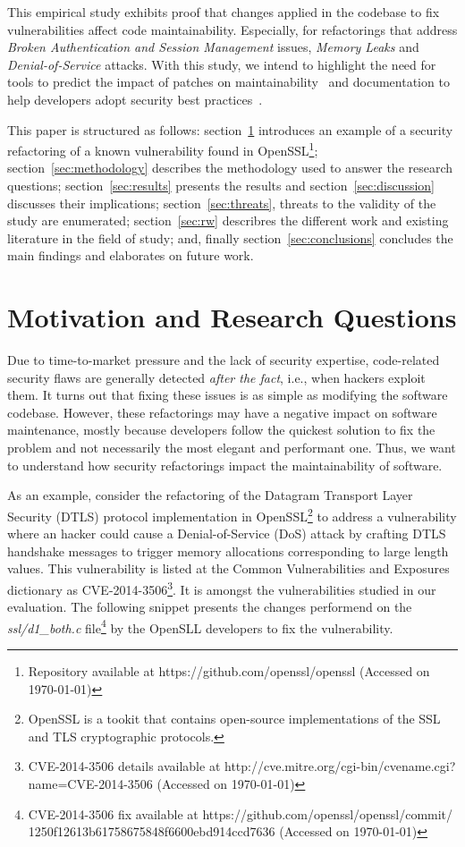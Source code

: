 \documentclass[10pt,conference]{IEEEtran}
\begin{document}
This empirical study exhibits proof that changes applied in the codebase to fix
vulnerabilities affect code maintainability. Especially, for refactorings that
address \emph{Broken Authentication and Session Management} issues, \emph{Memory
Leaks} and \emph{Denial-of-Service} attacks. With this study, we intend to highlight the need for tools
to predict the impact of patches on maintainability~\cite{4724577} and documentation
to help developers adopt security best practices~\cite{6311252, 7927935, MESQUIDA201519}.

This paper is structured as follows: section~\ref{sec:motivation} introduces an
example of a security refactoring of a known vulnerability found in
OpenSSL\footnote{Repository available at https://github.com/openssl/openssl
(Accessed on \today{})}; section~\ref{sec:methodology} describes the
methodology used to answer the research questions; section~\ref{sec:results}
presents the results and section~\ref{sec:discussion} discusses their
implications; section~\ref{sec:threats}, threats to the validity of the study
are enumerated; section~\ref{sec:rw} describres the different work and existing
literature in the field of study; and, finally section~\ref{sec:conclusions}
concludes the main findings and elaborates on future work.
%
\section{Motivation and Research Questions}\label{sec:motivation}
%
Due to time-to-market pressure and the lack of security expertise, code-related
security flaws are generally detected \textit{after the fact}, i.e., when
hackers exploit them. It turns out that fixing these issues is as simple as
modifying the software codebase. However, these refactorings may have a negative
impact on software maintenance, mostly because developers follow the quickest
solution to fix the problem and not necessarily the most elegant and performant
one. Thus, we want to understand how security refactorings impact the
maintainability of software.

As an example, consider the refactoring of the Datagram Transport Layer Security
(DTLS) protocol implementation in OpenSSL\footnote{OpenSSL is a tookit that
contains open-source implementations of the SSL and TLS cryptographic
protocols.} to address a vulnerability where an hacker could cause a Denial-of-Service
(DoS) attack by crafting DTLS handshake messages to trigger memory allocations
corresponding to large length values. This vulnerability is listed at the Common
Vulnerabilities and Exposures dictionary as CVE-2014-3506\footnote{CVE-2014-3506
details available at http://cve.mitre.org/cgi-bin/cvename.cgi?name=CVE-2014-3506
(Accessed on \today{})}. It is amongst the vulnerabilities studied in our
evaluation. The following snippet presents the changes performend on the
\emph{ssl/d1\_both.c} file\footnote{CVE-2014-3506 fix available  at
https://github.com/openssl/openssl/commit/\\1250f12613b61758675848f6600ebd914ccd7636
(Accessed on \today{})} by the OpenSLL developers to fix the vulnerability.
\end{document}
